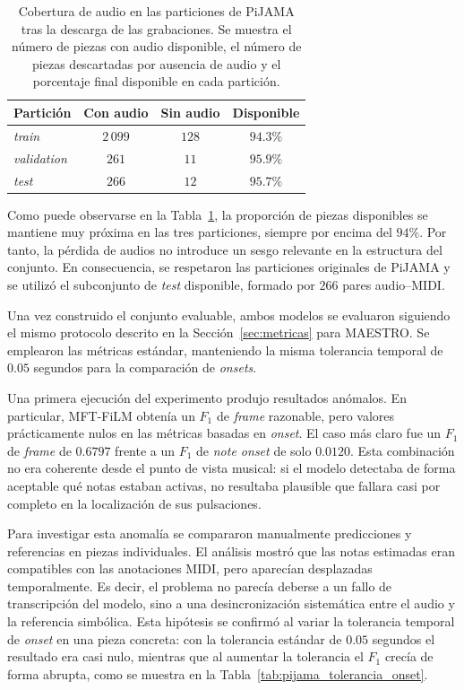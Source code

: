 \documentclass[11pt,spanish,listoffigures,listoftables]{tfgetsinf}
\begin{document}
\begin{table}[H]
  \centering
  \caption[Cobertura de audio en las particiones de PiJAMA]{%
  Cobertura de audio en las particiones de PiJAMA tras la descarga de las grabaciones.
  Se muestra el número de piezas con audio disponible, el número de piezas descartadas
  por ausencia de audio y el porcentaje final disponible en cada partición.}
  \label{tab:pijama_cobertura_splits}
  
  \begin{tabular}{lccc}
    \hline
    \textbf{Partición} &
    \textbf{Con audio} &
    \textbf{Sin audio} &
    \textbf{Disponible} \\
    \hline
    \textit{train}      & $2\,099$ & $128$ & $94.3\%$ \\
    \textit{validation} & $261$    & $11$  & $95.9\%$ \\
    \textit{test}       & $266$    & $12$  & $95.7\%$ \\
    \hline
  \end{tabular}
\end{table}

Como puede observarse en la Tabla~\ref{tab:pijama_cobertura_splits}, la proporción de piezas disponibles se mantiene muy próxima
en las tres particiones, siempre por encima del $94\%$. Por tanto, la pérdida de audios
no introduce un sesgo relevante en la estructura del conjunto. En consecuencia, se
respetaron las particiones originales de PiJAMA y se utilizó el subconjunto de
\textit{test} disponible, formado por $266$ pares audio--MIDI.

Una vez construido el conjunto evaluable, ambos modelos se evaluaron siguiendo el
mismo protocolo descrito en la Sección~\ref{sec:metricas} para MAESTRO. Se emplearon las métricas
estándar, manteniendo la misma tolerancia temporal de $0.05$ segundos para la comparación de \textit{onsets}.


Una primera ejecución del experimento produjo resultados anómalos. En
particular, MFT-FiLM obtenía un $F_1$ de \textit{frame} razonable, pero valores prácticamente
nulos en las métricas basadas en \textit{onset}. El caso más claro fue un $F_1$ de \textit{frame}
de $0.6797$ frente a un $F_1$ de \textit{note onset} de solo $0.0120$. Esta combinación no era
coherente desde el punto de vista musical: si el modelo detectaba de forma aceptable
qué notas estaban activas, no resultaba plausible que fallara casi por completo en la
localización de sus pulsaciones.

Para investigar esta anomalía se compararon manualmente predicciones y referencias
en piezas individuales. El análisis mostró que las notas estimadas eran compatibles con
las anotaciones MIDI, pero aparecían desplazadas temporalmente. Es decir, el problema
no parecía deberse a un fallo de transcripción del modelo, sino a una desincronización
sistemática entre el audio y la referencia simbólica. Esta hipótesis se confirmó al variar
la tolerancia temporal de \textit{onset} en una pieza concreta: con la tolerancia estándar de
$0.05$ segundos el resultado era casi nulo, mientras que al aumentar la tolerancia el
$F_1$ crecía de forma abrupta, como se muestra en la Tabla~\ref{tab:pijama_tolerancia_onset}.
\end{document}
